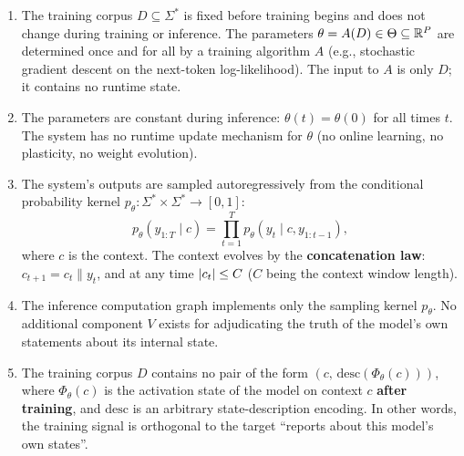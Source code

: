 \begin{assumption}
\begin{enumerate}[align=left, labelwidth=!, labelsep=0.8em, leftmargin=!, itemindent=0pt]
\item[($\Pi_1$)\textbf{Static pretraining}] The training corpus $D \subseteq \Sigma^{*}$ is
fixed before training begins and does not change during training or inference. The parameters
$\theta = A(D) \in \Theta \subseteq \mathbb{R}^{P}$ are determined once and for all by a training
algorithm $A$ (e.g., stochastic gradient descent on the next-token log-likelihood). The input
to $A$ is only $D$; it contains no runtime state.
\item[($\Pi_2$)\textbf{Frozen at inference}] The parameters are constant during inference:
$\theta(t) = \theta(0)$ for all times $t$. The system has no runtime update mechanism for
$\theta$ (no online learning, no plasticity, no weight evolution).
\item[($\Pi_3$)\textbf{Autoregressive decoding}] The system's outputs are sampled
autoregressively from the conditional probability kernel
$p_\theta: \Sigma^{*} \times \Sigma^{*} \to [0,1]$:
\begin{equation}
p_\theta(y_{1:T} \mid c) = \prod_{t=1}^{T} p_\theta\!\left(y_t \mid c, y_{1:t-1}\right),
\label{eq:autoregressive}
\end{equation}
where $c$ is the context. The context evolves by the \textbf{concatenation law}:
$c_{t+1} = c_t \| y_t$, and at any time $\left\lvert c_t \right\rvert \le C$ ($C$ being the context window
length).
\item[($\Pi_4$)\textbf{No explicit verifier}] The inference computation graph implements only
the sampling kernel $p_\theta$. No additional component $V$ exists for adjudicating the truth
of the model's own statements about its internal state.
\item[($\Pi_5$)\textbf{Absence of state labels}] The training corpus $D$ contains no pair of
the form $(c,\, \mathrm{desc}(\Phi_\theta(c)))$, where $\Phi_\theta(c)$ is the activation
state of the model on context $c$ \textbf{after training}, and $\mathrm{desc}$ is an arbitrary
state-description encoding. In other words, the training signal is orthogonal to the target
``reports about this model's own states''.
\end{enumerate}
\end{assumption}

